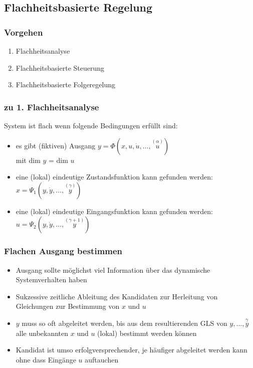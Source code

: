 \documentclass[6pt,a4paper,fleqn]{scrartcl}
\newcommand{\os}[2]{\ensuremath{\overset{#1}{#2}}}
\begin{document}
\begin{multicols*}{4}
\section{Flachheitsbasierte Regelung}

\subsubsection*{Vorgehen}
\begin{enumerate}
  \item Flachheitsanalyse
  \item Flachheitsbasierte Steuerung
  \item Flachheitsbasierte Folgeregelung
\end{enumerate}

\subsubsection*{zu 1. Flachheitsanalyse}

System ist flach wenn folgende Bedingungen erfüllt sind:
\begin{itemize}
  \item es gibt (fiktiven) Ausgang $y = \Phi(x, u, \dot{u}, \dots, \os{(\alpha)}{u})$ \\
    mit dim $y$ = dim $u$
  \item eine (lokal) eindeutige Zustandsfunktion kann gefunden werden: \\
    $x = \Psi_1 (y, \dot{y}, \dots, \os{(\gamma)}{y})$
  \item eine (lokal) eindeutige Eingangsfunktion kann gefunden werden: \\
    $u = \Psi_2 (y, \dot{y}, \dots, \os{(\gamma +1)}{y})$
\end{itemize}

\subsubsection*{Flachen Ausgang bestimmen}
\begin{itemize}
  \item Ausgang sollte möglichst viel Information über das dynamische Systemverhalten haben
  \item Sukzessive zeitliche Ableitung des Kandidaten zur Herleitung von Gleichungen zur Bestimmung von $x$ und $u$
  \item $y$ muss so oft abgeleitet werden, bis aus dem resultierenden GLS von $y,\dots,\os{\gamma}{y}$ alle unbekannten $x$ und $u$ (lokal) bestimmt werden können
  \item Kandidat ist umso erfolgversprechender, je häufiger abgeleitet werden kann ohne dass Eingänge $u$ auftauchen
\end{itemize}


\end{multicols*}
\end{document}
